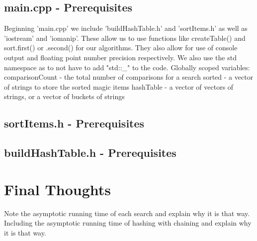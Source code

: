 \documentclass[12pt, letterpaper]{article}
\begin{document}
\subsection{main.cpp - Prerequisites} \label{Prereq}

Beginning 'main.cpp' we include 'buildHashTable.h' and 'sortItems.h' as well as 'iostream' and 'iomanip'.
These allow us to use functions like createTable() and sort.first() or .second() for our algorithms.
They also allow for use of console output and floating point number precision respectively. 
We also use the std namespace as to not have to add "std::\_" to the code.
\newline
\newline
Globally scoped variables:
\newline
\indent comparisonCount - the total number of comparisons for a search
\newline
\indent sorted - a vector of strings to store the sorted magic items
\newline
\indent hashTable - a vector of vectors of strings, or a vector of buckets of strings

\subsection{sortItems.h - Prerequisites} \label{SrtItmGV}


\subsection{buildHashTable.h - Prerequisites} \label{BldHshTblGV}

\newpage

\section{Final Thoughts}
Note the asymptotic running time of each search and explain why it is that way. 
Including the asymptotic running time of	hashing	with chaining and explain why it is that way.
\end{document}
